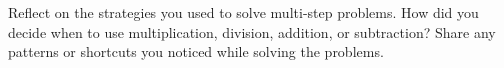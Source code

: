\documentclass[12pt]{article}
\begin{document}
\vspace{1em}

\begin{tcolorbox}[colframe=black!60, colback=white, 
coltitle=black, colbacktitle=black!15, fonttitle=\bfseries\Large, 
title=Reflection, halign title=center, left=10pt, right=10pt, top=10pt, bottom=100pt]
Reflect on the strategies you used to solve multi-step problems. How did you decide when to use multiplication, division, addition, or subtraction?  Share any patterns or shortcuts you noticed while solving the problems.
\end{tcolorbox}
\end{document}
